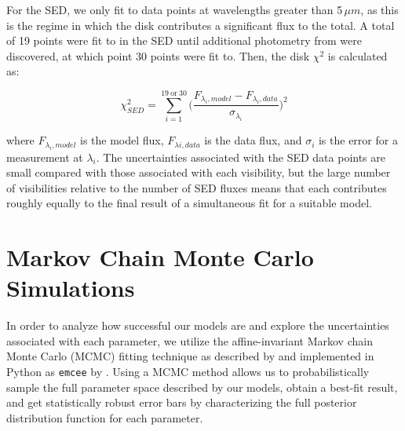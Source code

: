 For the SED, we only fit to data points at wavelengths greater than 5$\,\mu m$, as this is the regime in which the disk contributes a significant flux to the total. A total of 19 points were fit to in the SED until additional photometry from \cite{Robe13} were discovered, at which point 30 points were fit to. Then, the disk $\chi^{2}$ is calculated as:

\begin{equation}
\chi^{2}_{SED} =  \sum_{i=1}^{19~\text{or}~30} \big(\frac{F_{\lambda_{i},model} - F_{\lambda_{i},data}}{\sigma_{\lambda_{i}}}\big)^{2}
\end{equation} 

where $F_{\lambda_{i},model}$ is the model flux, $F_{\lambda{i},data}$ is the data flux, and $\sigma_{i}$ is the error for a measurement at $\lambda_{i}$. The uncertainties associated with the SED data points are small compared with those associated with each visibility, but the large number of visibilities relative to the number of SED fluxes means that each contributes roughly equally to the final result of a simultaneous fit for a suitable model. 




\section{Markov Chain Monte Carlo Simulations}
\label{MCMC}

In order to analyze how successful our models are and explore the uncertainties associated with each parameter, we utilize the affine-invariant Markov chain Monte Carlo (MCMC) fitting technique as described by \cite{Good10} and implemented in Python as \texttt{emcee} by \cite{Fore13}. Using a MCMC method allows us to probabilistically sample the full parameter space described by our models, obtain a best-fit result, and get statistically robust error bars by characterizing the full posterior distribution function for each parameter. 

